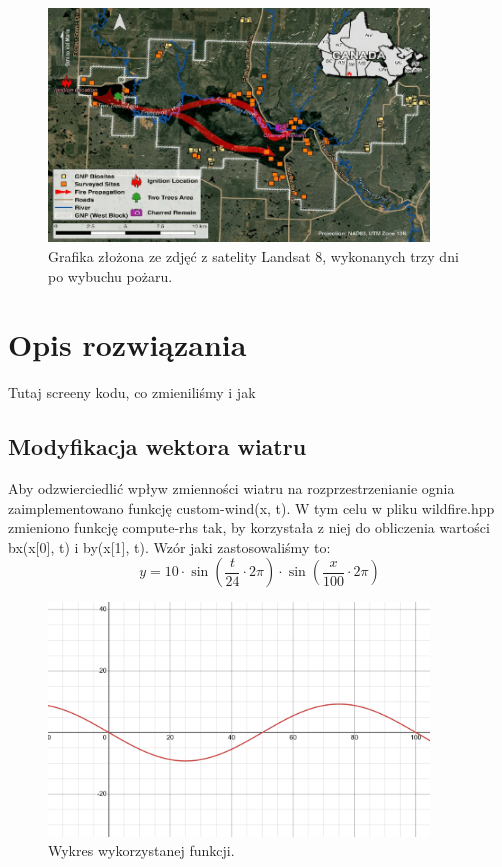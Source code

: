 \documentclass[onecolumn,12pt]{article}
\begin{document}
\begin{figure}[h]
    \centering
    \includegraphics[width=0.9\textwidth]{fire-map-1.png}
    \caption{Grafika złożona ze zdjęć z satelity Landsat 8, wykonanych trzy dni po wybuchu pożaru.}
    \label{fig:example}
\end{figure}
        
\section{Opis rozwiązania}
Tutaj screeny kodu, co zmieniliśmy i jak

\subsection{Modyfikacja wektora wiatru}
Aby odzwierciedlić wpływ zmienności wiatru na rozprzestrzenianie ognia zaimplementowano funkcję custom-wind(x, t). W tym celu w pliku wildfire.hpp  zmieniono funkcję compute-rhs tak, by korzystała z niej do obliczenia wartości bx(x[0], t) i by(x[1], t). Wzór jaki zastosowaliśmy to:
\[
y = 10 \cdot\sin\left(\frac{t}{24} \cdot 2\pi\right) \cdot \sin\left(\frac{x}{100} \cdot 2\pi\right)
\]

\begin{figure}[h]
    \centering
    \includegraphics[width=0.9\textwidth]{wind graph.png}
    \caption{Wykres wykorzystanej funkcji.}
    \label{fig:example}
\end{figure}
\end{document}
